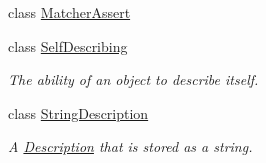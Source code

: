 \begin{DoxyCompactItemize}
class \hyperlink{class_hamcrest_qt_1_1_matcher_assert}{Matcher\-Assert}
\item 
class \hyperlink{class_hamcrest_qt_1_1_self_describing}{Self\-Describing}
\begin{DoxyCompactList}\small\item\em The ability of an object to describe itself. \end{DoxyCompactList}\item 
class \hyperlink{class_hamcrest_qt_1_1_string_description}{String\-Description}
\begin{DoxyCompactList}\small\item\em A \hyperlink{class_hamcrest_qt_1_1_description}{Description} that is stored as a string. \end{DoxyCompactList}\end{DoxyCompactItemize}
